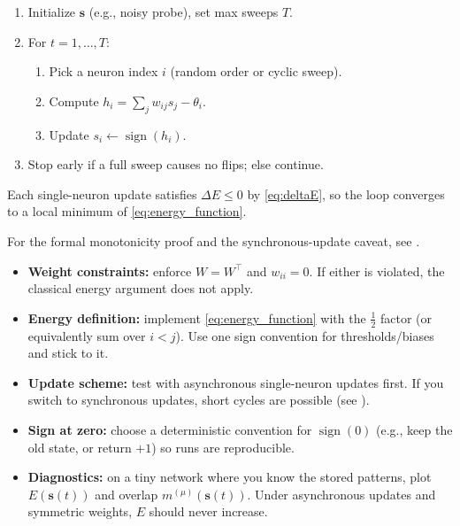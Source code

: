 \begin{tcolorbox}[summarybox, title={Asynchronous Hopfield update (pseudo-code)}]
\begin{enumerate}
    \item Initialize \(\mathbf{s}\) (e.g., noisy probe), set max sweeps \(T\).
    \item For \(t=1,\dots, T\):
    \begin{enumerate}
        \item Pick a neuron index \(i\) (random order or cyclic sweep).
        \item Compute \(h_i = \sum_j w_{ij} s_j - \theta_i\).
        \item Update \(s_i \leftarrow \operatorname{sign}(h_i)\).
    \end{enumerate}
    \item Stop early if a full sweep causes no flips; else continue.
\end{enumerate}
Each single-neuron update satisfies \(\Delta E \le 0\) by \eqref{eq:deltaE}, so the loop converges to a local minimum of \eqref{eq:energy_function}.
\end{tcolorbox}

For the formal monotonicity proof and the synchronous-update caveat, see .

\begin{tcolorbox}[summarybox, title={Implementation checklist (debugging a Hopfield net)}]
\begin{itemize}
    \item \textbf{Weight constraints:} enforce \(W=W^\top\) and \(w_{ii}=0\). If either is violated, the classical energy argument does not apply.
    \item \textbf{Energy definition:} implement \eqref{eq:energy_function} with the \(\tfrac{1}{2}\) factor (or equivalently sum over \(i<j\)). Use one sign convention for thresholds/biases and stick to it.
    \item \textbf{Update scheme:} test with asynchronous single-neuron updates first. If you switch to synchronous updates, short cycles are possible (see ).
    \item \textbf{Sign at zero:} choose a deterministic convention for \(\operatorname{sign}(0)\) (e.g., keep the old state, or return \(+1\)) so runs are reproducible.
    \item \textbf{Diagnostics:} on a tiny network where you know the stored patterns, plot \(E(\mathbf{s}(t))\) and overlap \(m^{(\mu)}(\mathbf{s}(t))\). Under asynchronous updates and symmetric weights, \(E\) should never increase.
\end{itemize}
\end{tcolorbox}

